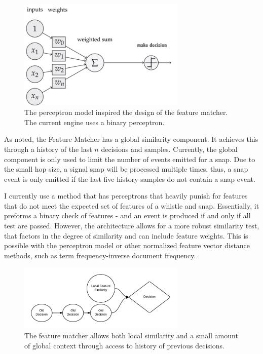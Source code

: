 \documentclass[DIV=calc, paper=a4, fontsize=11pt, twocolumn]{scrartcl}   %
\begin{document}
\begin{figure}[h]
   \centering
   \includegraphics[width=80mm]{figures/perceptronmodel.png}
   \caption{The perceptron model inspired the design of the feature matcher. The current engine uses a binary perceptron.}
   \label{overflow}
\end{figure}


\par As noted, the Feature Matcher has a global similarity component. It achieves this through a history of the last $n$ decisions and samples. Currently, the global component is only used to limit the number of events emitted for a snap. Due to the small hop size, a signal snap will be processed multiple times, thus, a snap event is only emitted if the last five history samples do not contain a snap event.

\par  I currently use a method that has perceptrons that heavily punish for features that do not meet the expected set of features of a whistle and snap. Essentially, it preforms a binary check of features - and an event is produced if and only if all test are passed.  However, the architecture allows for a more robust similarity test, that factors in the degree of similarity and can include feature weights. This is possible with the perceptron model or other normalized feature vector distance methods, such as term frequency-inverse document frequency.

\begin{figure}[h]
   \centering
   \includegraphics[width=80mm]{figures/FeatureMatcherFuture.png}
   \caption{The feature matcher allows both local similarity and a small amount of global context through access to history of previous decisions.}
   \label{overflow}
\end{figure}
\end{document}
